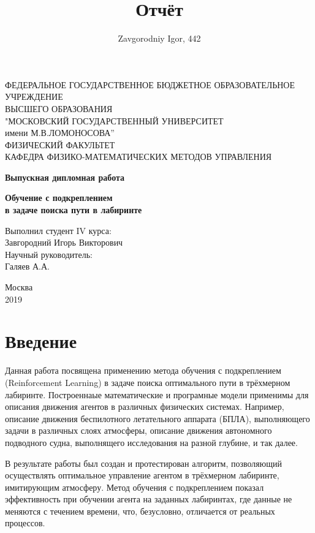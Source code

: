 \documentclass[12pt, a4paper]{report}
\author{Zavgorodniy Igor, 442}
\title{Отчёт}
\date{}
\theoremstyle{definition}
\theoremstyle{plain}
\theoremstyle{remark}
\theoremstyle{remark}
\theoremstyle{definition}
\begin{document}
\begin{titlepage}
  \begin{center}
    \large
   ФЕДЕРАЛЬНОЕ ГОСУДАРСТВЕННОЕ БЮДЖЕТНОЕ ОБРАЗОВАТЕЛЬНОЕ УЧРЕЖДЕНИЕ\\ ВЫСШЕГО ОБРАЗОВАНИЯ\\ "МОСКОВСКИЙ ГОСУДАРСТВЕННЫЙ УНИВЕРСИТЕТ\\ имени М.В.ЛОМОНОСОВА''\\
    ФИЗИЧЕСКИЙ ФАКУЛЬТЕТ\\КАФЕДРА ФИЗИКО-МАТЕМАТИЧЕСКИХ МЕТОДОВ УПРАВЛЕНИЯ

	\underline{\hspace{12cm}}

    \vfill

    {\LARGE \textbf{Выпускная дипломная работа}}
  	\bigskip
  	
    {\textbf{Обучение с подкреплением\\ в задаче поиска пути в лабиринте}}  	
  	\bigskip


\end{center}
\vfill

\begin{flushright}
Выполнил студент IV курса:\\
Завгородний Игорь Викторович\\
\bigskip
Научный руководитель:\\
Галяев А.А.
\end{flushright}
\vfill

\begin{center}
  Москва\\2019
\end{center}
\end{titlepage}

\newpage
\section{Введение}
Данная работа посвящена применению метода обучения с подкреплением (Reinforcement Learning) в задаче поиска оптимального пути в трёхмерном лабиринте. Построеннаые математические и програмные модели применимы для описания движения агентов в различных физических системах. Например, описание движения беспилотного летательного аппарата (БПЛА), выполняющего задачи в различных слоях атмосферы, описание движения автономного подводного судна, выполнящего исследования на разной глубине, и так далее.

В результате работы был создан и протестирован алгоритм, позволяющий осуществлять оптимальное управление агентом в трёхмерном лабиринте, имитирующим атмосферу. Метод обучения с подкреплением показал эффективность при обучении агента на заданных лабиринтах, где данные не меняются с течением времени, что, безусловно, отличается от реальных процессов.
\end{document}
